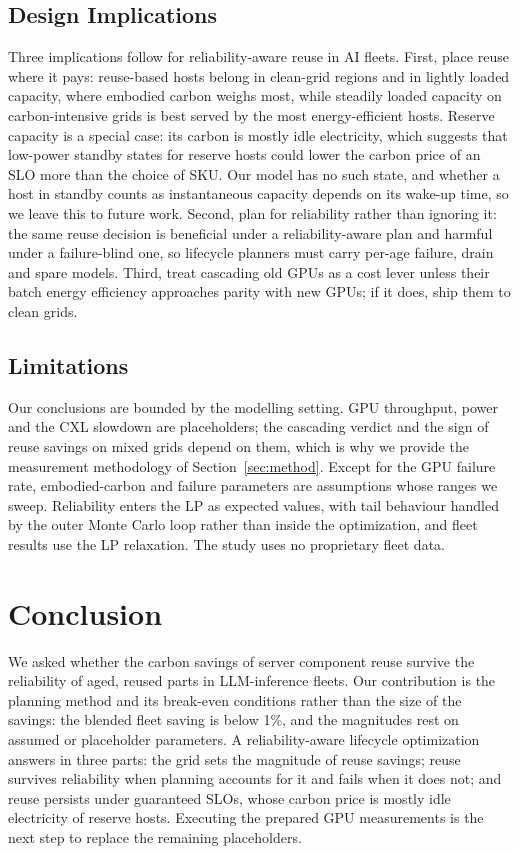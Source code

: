 \documentclass[11pt]{article}
\begin{document}
\subsection{Design Implications}
Three implications follow for reliability-aware reuse in AI fleets. First, place reuse where it pays: reuse-based hosts belong in clean-grid regions and in lightly loaded capacity, where embodied carbon weighs most, while steadily loaded capacity on carbon-intensive grids is best served by the most energy-efficient hosts. Reserve capacity is a special case: its carbon is mostly idle electricity, which suggests that low-power standby states for reserve hosts could lower the carbon price of an SLO more than the choice of SKU. Our model has no such state, and whether a host in standby counts as instantaneous capacity depends on its wake-up time, so we leave this to future work. Second, plan for reliability rather than ignoring it: the same reuse decision is beneficial under a reliability-aware plan and harmful under a failure-blind one, so lifecycle planners must carry per-age failure, drain and spare models. Third, treat cascading old GPUs as a cost lever unless their batch energy efficiency approaches parity with new GPUs; if it does, ship them to clean grids.

\subsection{Limitations}
Our conclusions are bounded by the modelling setting. GPU throughput, power and the CXL slowdown are placeholders; the cascading verdict and the sign of reuse savings on mixed grids depend on them, which is why we provide the measurement methodology of Section~\ref{sec:method}. Except for the GPU failure rate, embodied-carbon and failure parameters are assumptions whose ranges we sweep. Reliability enters the LP as expected values, with tail behaviour handled by the outer Monte Carlo loop rather than inside the optimization, and fleet results use the LP relaxation. The study uses no proprietary fleet data.

\section{Conclusion}
\label{sec:conclusion}
We asked whether the carbon savings of server component reuse survive the reliability of aged, reused parts in LLM-inference fleets. Our contribution is the planning method and its break-even conditions rather than the size of the savings: the blended fleet saving is below 1\%, and the magnitudes rest on assumed or placeholder parameters. A reliability-aware lifecycle optimization answers in three parts: the grid sets the magnitude of reuse savings; reuse survives reliability when planning accounts for it and fails when it does not; and reuse persists under guaranteed SLOs, whose carbon price is mostly idle electricity of reserve hosts. Executing the prepared GPU measurements is the next step to replace the remaining placeholders.
\end{document}
